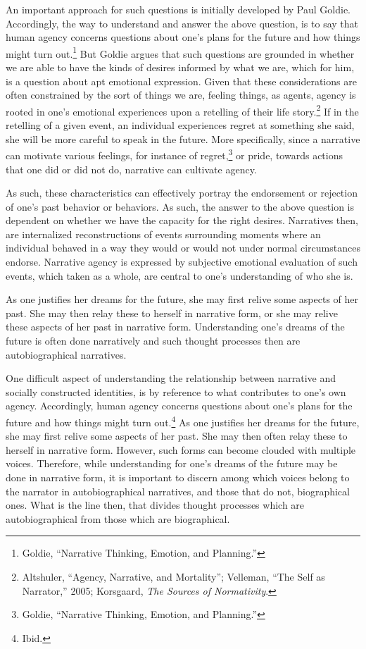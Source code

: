 \documentclass[phdthesis,12pt,final,a4paper]{wuthesis}
\theoremstyle{definition}
\theoremstyle{definition}
\theoremstyle{definition}
\theoremstyle{definition}
\theoremstyle{remark}
\begin{document}
An important approach for such questions is initially developed by Paul Goldie. Accordingly, the way to understand and answer the above question, is to say that human agency concerns questions about one's plans for the future and how things might turn out.\footnote{Goldie, {``Narrative {Thinking}, {Emotion}, and {Planning}.''}} But Goldie argues that such questions are grounded in whether we are able to have the kinds of desires informed by what we are, which for him, is a question about apt emotional expression. Given that these considerations are often constrained by the sort of things we are, feeling things, as agents, agency is rooted in one's emotional experiences upon a retelling of their life story.\footnote{Altshuler, {``Agency, Narrative, and Mortality''}; Velleman, {``The {Self} as {Narrator},''} 2005; Korsgaard, \emph{The Sources of Normativity}.} If in the retelling of a given event, an individual experiences regret at something she said, she will be more careful to speak in the future. More specifically, since a narrative can motivate various feelings, for instance of regret,\footnote{Goldie, {``Narrative {Thinking}, {Emotion}, and {Planning}.''}} or pride, towards actions that one did or did not do, narrative can cultivate agency.

As such, these characteristics can effectively portray the endorsement or rejection of one's past behavior or behaviors. As such, the answer to the above question is dependent on whether we have the capacity for the right desires. Narratives then, are internalized reconstructions of events surrounding moments where an individual behaved in a way they would or would not under normal circumstances endorse. Narrative agency is expressed by subjective emotional evaluation of such events, which taken as a whole, are central to one's understanding of who she is.

As one justifies her dreams for the future, she may first relive some aspects of her past. She may then relay these to herself in narrative form, or she may relive these aspects of her past in narrative form. Understanding one's dreams of the future is often done narratively and such thought processes then are autobiographical narratives.

One difficult aspect of understanding the relationship between narrative and socially constructed identities, is by reference to what contributes to one's own agency. Accordingly, human agency concerns questions about one's plans for the future and how things might turn out.\footnote{Ibid.} As one justifies her dreams for the future, she may first relive some aspects of her past. She may then often relay these to herself in narrative form. However, such forms can become clouded with multiple voices. Therefore, while understanding for one's dreams of the future may be done in narrative form, it is important to discern among which voices belong to the narrator in autobiographical narratives, and those that do not, biographical ones. What is the line then, that divides thought processes which are autobiographical from those which are biographical.
\end{document}

